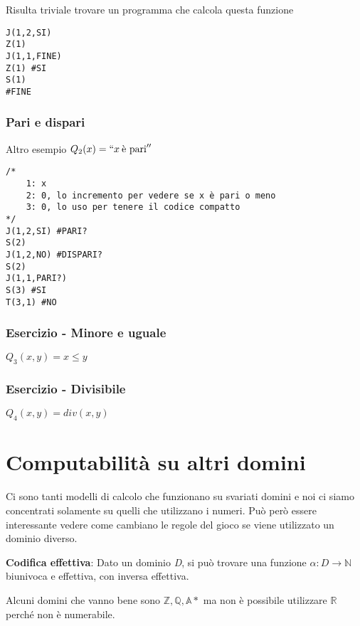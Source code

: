 Risulta triviale trovare un programma che calcola questa funzione

\begin{lstlisting}[language=URM]
J(1,2,SI)
Z(1)
J(1,1,FINE)
Z(1) #SI
S(1)
#FINE
\end{lstlisting}

\subsubsection{Pari e dispari}\label{pari-e-dispari}

Altro esempio $Q_2(x) = ``x \:\text{è pari}''$

\begin{lstlisting}[language=URM]
/*
    1: x
    2: 0, lo incremento per vedere se x è pari o meno
    3: 0, lo uso per tenere il codice compatto
*/
J(1,2,SI) #PARI?
S(2)
J(1,2,NO) #DISPARI?
S(2)
J(1,1,PARI?)
S(3) #SI
T(3,1) #NO
\end{lstlisting}

\subsubsection{Esercizio - Minore e uguale}\label{esercizio---minore-e-uguale}

$Q_3(x,y) = x \leq y$


\subsubsection{Esercizio - Divisibile}\label{esercizio---divisibile}

$Q_4(x,y) = div(x,y)$

\section{Computabilità su altri domini}\label{computabilituxe0-su-altri-domini}

Ci sono tanti modelli di calcolo che funzionano su svariati domini e noi
ci siamo concentrati solamente su quelli che utilizzano i numeri. 
Può però essere interessante vedere come cambiano le regole del gioco se viene
utilizzato un dominio diverso.

\textbf{Codifica effettiva}: Dato un dominio \emph{D}, si può trovare
una funzione $\alpha : D \rightarrow \mathbb{N}$ biunivoca e effettiva,
con inversa effettiva.

Alcuni domini che vanno bene sono $\mathbb{Z}, \mathbb{Q}, \mathbb{A}*$ ma non è possibile
utilizzare $\mathbb{R}$ perché non è numerabile.

